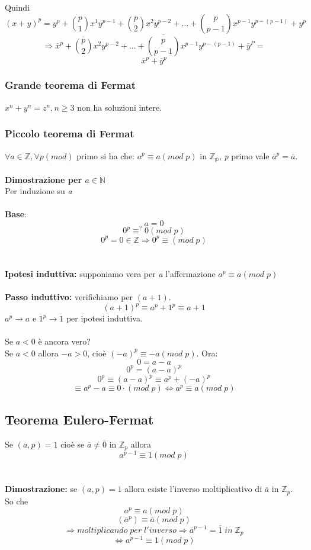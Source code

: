 Quindi
\[(x+y)^p=y^p+\binom{p}{1}x^1y^{p-1}+\binom{p}{2}x^2y^{p-2}+\dots+\binom{p}{p-1}x^{p-1}y^{p-(p-1)}+y^p\]
\[\Rightarrow \overline{x}^p+\overline{\binom{p}{2}}x^2y^{p-2}+...+\overline{\binom{p}{p-1}}x^{p-1}y^{p-(p-1)}+\overline{y}^P=\]
\[\overline{x}^p+\overline{y}^p\]

\subsubsection{Grande teorema di Fermat}
\(x^n+y^n=z^n, n\geq 3\) non ha soluzioni intere.

\subsubsection{Piccolo teorema di Fermat}
\(\forall a\in\mathbb{Z}, \forall p(mod)\) primo si ha che: \(a^p\equiv a(mod\;p)\) in \(\mathbb{Z_p}\), \textit{p} primo vale \(\overline{a}^p=\overline{a}\).
\\\\
\textbf{Dimostrazione per \(a\in\mathbb{N}\)}
\\Per induzione su \textit{a}
\\\\\textbf{Base}: \[a=0\]
\[0^p\equiv ^? 0(mod\;p)\]
\[0^p=0\in\mathbb{Z}\Rightarrow 0^p\equiv (mod\;p)\]
\\\\
\textbf{Ipotesi induttiva:} supponiamo vera per \textit{a} l'affermazione \(a^p\equiv a(mod\;p)\)
\\\\
\textbf{Passo induttivo:} verifichiamo per \((a+1)\).
\[(a+1)^p\equiv a^p+1^p \equiv a+1\]
\(a^p\rightarrow a\) e \(1^p\rightarrow 1\) per ipotesi induttiva.
\\\\
Se \(a<0\) è ancora vero?
\\ Se \(a<0\) allora \(-a>0\), cioè \((-a)^p\equiv -a(mod\;p)\). 
Ora:
\[0=a-a\]
\[0^p=(a-a)^p\]
\[0^p\equiv (a-a)^p\equiv a^p+(-a)^p\]
\[\equiv a^p-a\equiv 0\cdot (mod\;p)\Leftrightarrow a^p\equiv a(mod\;p)\]

\subsection{Teorema Eulero-Fermat}
Se \((a,p)=1\) cioè se \(\overline{a}\neq \overline{0}\) in \(\mathbb{Z}_p\) allora
\[a^{p-1}\equiv 1(mod\;p)\]
\\\\
\textbf{Dimostrazione:} se \((a,p)=1\) allora esiste l'inverso moltiplicativo di \(\overline{a}\) in \(\mathbb{Z}_p\).
\\
So che \[a^p\equiv a(mod\;p)\]
\[(\overline{a}^p)\equiv \overline{a}(mod\;p)\]
\[\Rightarrow moltiplicando\;per\;l'inverso \Rightarrow \overline{a}^{p-1}=\overline{1}\;in\;\mathbb{Z}_p\]
\[\Leftrightarrow a^{p-1}\equiv 1(mod\;p)\]

